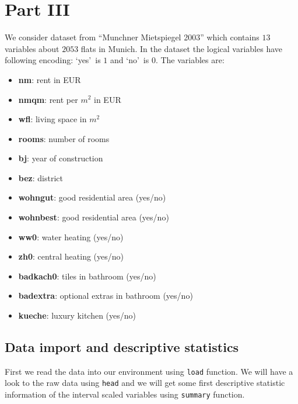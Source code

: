 \documentclass{article}
\begin{document}
\section{Part III}

We consider dataset from ``Munchner Mietspiegel 2003'' which contains $13$ variables about $2053$ flats in Munich. In the dataset the logical variables have following encoding: \lq yes\rq\ is $1$ and \lq no\rq\ is $0$. The variables are:

\begin{itemize}
\item \textbf{nm}: rent in EUR
\item \textbf{nmqm}: rent per $m^2$ in EUR
\item \textbf{wfl}: living space in $m^2$
\item \textbf{rooms}: number of rooms
\item \textbf{bj}: year of construction
\item \textbf{bez}: district
\item \textbf{wohngut}: good residential area (yes/no)
\item \textbf{wohnbest}: good residential area (yes/no)
\item \textbf{ww0}: water heating (yes/no)
\item \textbf{zh0}: central heating (yes/no)
\item \textbf{badkach0}: tiles in bathroom (yes/no)
\item \textbf{badextra}: optional extras in bathroom (yes/no)
\item \textbf{kueche}: luxury kitchen (yes/no)
\end{itemize}

\subsection{Data import and descriptive statistics}

First we read the data into our environment using \texttt{load} function. We will have a look to the raw data using \texttt{head} and we will get some first descriptive statistic information of the interval scaled variables using \texttt{summary} function.
\end{document}

